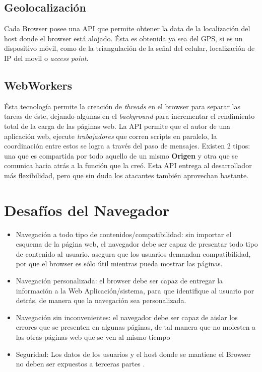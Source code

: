     \subsection{Geolocalización}
    Cada Browser posee una API que permite obtener la data de la localización del host donde el browser está alojado. Ésta es obtenida ya sea del GPS, si es un dispositivo móvil, como de la triangulación de la señal del celular, localización de IP del movil o \textit{access point}.

    \subsection{WebWorkers}
    \label{chap2:WWs}
    Ésta tecnología permite la creación de \textit{threads} en el browser para separar las tareas de éste, dejando algunas en el \textit{background} para incrementar el rendimiento total de la carga de las páginas web. La API permite que el autor de una aplicación web, ejecute \textit{trabajadores} que corren scripts en paralelo, la coordinación entre estos se logra a través del paso de mensajes. Existen 2 tipos: una que es compartida por todo aquello de un mismo \textbf{Origen} y otra que se comunica hacia atrás a la función que la creó. Esta API entrega al desarrollador más flexibilidad, pero que sin duda los atacantes también aprovechan bastante.


\section{Desafíos del Navegador}
    \label{chap2:Desafios}
    \begin{itemize}
        \item Navegación a todo tipo de contenidos/compatibilidad: sin importar el esquema de la página web, el navegador debe ser capaz de presentar todo tipo de contenido al usuario. \cite{barth2008security} asegura que los usuarios demandan compatibilidad, por que el browser es sólo útil mientras pueda mostrar las páginas.
        \item Navegación personalizada: el browser debe ser capaz de entregar la información a la Web Aplicación/sistema, para que identifique al usuario por detrás, de manera que la navegación sea personalizada.
        \item Navegación sin inconvenientes: el navegador debe ser capaz de aislar los errores que se presenten en algunas páginas, de tal manera que no molesten a las otras páginas web que se ven al mismo tiempo \cite{IE8-LCIE, preprint-grosskurth-browser-archevol, barth2008security}
        \item Seguridad: Los datos de los usuarios y el host donde se mantiene el Browser no deben ser expuestos a terceras partes \cite{Reis2009, barth2009securing, Barth2010, Liu2012, barth2009attacks, Saini2014}.
    \end{itemize}


